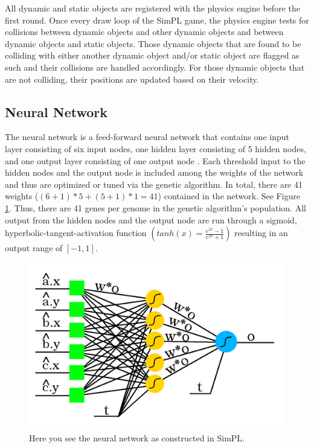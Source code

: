 \documentclass[a4paper,10pt]{article}
\begin{document}
All dynamic and static objects are registered with the physics engine before the first round. Once every draw loop of the SimPL game, the physics engine tests for collisions between dynamic objects and other dynamic objects and between dynamic objects and static objects. Those dynamic objects that are found to be colliding with either another dynamic object and/or static object are flagged as such and their collisions are handled accordingly. For those dynamic objects that are not colliding, their positions are updated based on their velocity.

\subsection{Neural Network}

The neural network is a feed-forward neural network that contains one input layer consisting of six input nodes, one hidden layer consisting of 5 hidden nodes, and one output layer consisting of one output node \cite{neuralnetworks}. Each threshold input to the hidden nodes and the output node is included among the weights of the network and thus are optimized or tuned via the genetic algorithm. In total, there are 41 weights ($(6+1)*5+(5+1)*1=41$) contained in the network. See Figure \ref{fig:nn}. Thus, there are 41 genes per genome in the genetic algorithm's population. All output from the hidden nodes and the output node are run through a sigmoid, hyperbolic-tangent-activation function $\left ( tanh(x)=\frac{e^{2x}-1}{e^{2x}+1} \right )$ resulting in an output range of $[-1,1]$.

\begin{figure}[H]  
  \centering
  \includegraphics[width=1\textwidth]{figures/nn.png}
  \caption{Here you see the neural network as constructed in SimPL.}
  \label{fig:nn}
\end{figure}
\end{document}
